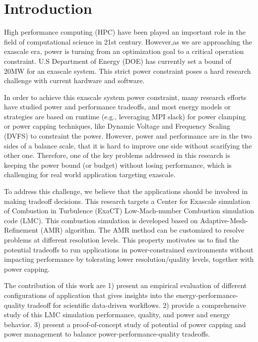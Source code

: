 \documentclass[10pt, conference, compsocconf]{IEEEtran}
\begin{document}
\section{Introduction}

High performance computing (HPC) have been played an important role in the field of computational science in 21st century. However,as we are approaching the exascale era, power is turning from an optimization goal to a critical operation constraint. U.S Department of Energy (DOE) has currently set a bound of 20MW for an exascale system.\cite{tolentino2012optimist} This strict power constraint poses a hard research challenge with current hardware and software. 

In order to achieve this exascale system power constraint, many research efforts have studied power and performance tradeoffs, and most energy models or strategies are based on runtime (e.g., leveraging MPI slack) for power clamping or power capping techniques, like Dynamic Voltage and Frequency Scaling (DVFS) to constraint the power. However, power and performance are in the two sides of a balance scale, that it is hard to improve one side without scarifying the other one. Therefore, one of the key problems addressed in this research is keeping the power bound (or budget) without losing performance, which is challenging for real world application targeting exascale.

To address this challenge, we believe that the applications should be involved in making tradeoff decisions. This research targets a Center for Exascale simulation of Combustion in Turbulence (ExaCT) Low-Mach-number Combustion simulation code (LMC). \cite{exact} This combustion simulation is developed based on Adaptive-Mesh-Refinement (AMR) algorithm. The AMR method can be customized to resolve problems at different resolution levels. This property motivates us to find the potential tradeoffs to run applications in power-constrained environments without impacting performance by tolerating lower resolution/quality levels, together with power capping.

The contribution of this work are 1) present an empirical evaluation of different configurations of application that gives insights into the energy-performance-quality tradeoff for scientific data-driven workflows. 2) provide a comprehensive study of this LMC simulation performance, quality, and power and energy behavior. 3) present a proof-of-concept study of potential of power capping and power management to balance power-performance-quality tradeoffs.
\end{document}
